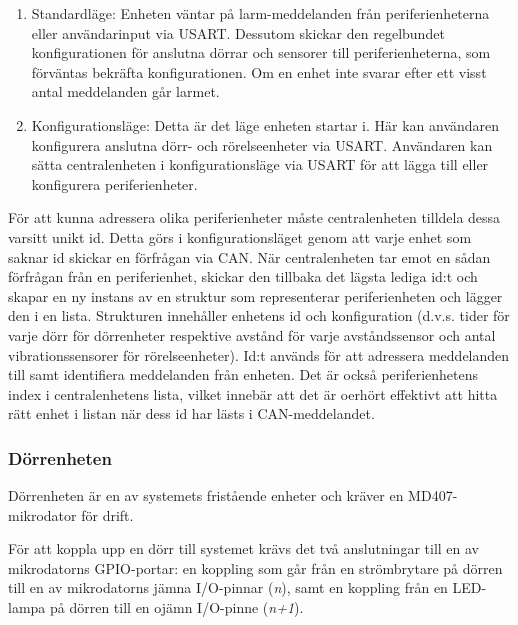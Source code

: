 \documentclass{article}
\begin{document}
\begin{enumerate}
    \item Standardläge: Enheten väntar på larm-meddelanden från periferienheterna eller användarinput via USART. Dessutom skickar den regelbundet  konfigurationen för anslutna dörrar och sensorer till periferienheterna, som förväntas bekräfta konfigurationen. Om en enhet inte svarar efter ett visst antal meddelanden går larmet.
    \item Konfigurationsläge: Detta är det läge enheten startar i. 
     Här kan användaren konfigurera anslutna dörr- och
 rörelseenheter via USART. Användaren kan sätta centralenheten i konfigurationsläge
      via USART för att lägga till eller konfigurera periferienheter.
\end{enumerate}

För att kunna adressera olika periferienheter måste centralenheten tilldela dessa varsitt unikt id. Detta görs i konfigurationsläget genom att varje enhet som saknar id skickar en förfrågan via CAN. När centralenheten tar emot en sådan förfrågan från en periferienhet, skickar den tillbaka det lägsta lediga id:t och skapar en ny instans av en struktur som representerar periferienheten och lägger den i en lista. Strukturen innehåller enhetens id och konfiguration (d.v.s. tider för varje dörr för dörrenheter respektive avstånd för varje avståndssensor och antal vibrationssensorer för rörelseenheter).
Id:t används för att adressera meddelanden till samt identifiera meddelanden från enheten. Det är också periferienhetens index i centralenhetens lista, vilket innebär att det är oerhört effektivt att hitta rätt enhet i listan när dess id har lästs i CAN-meddelandet.





\subsubsection{Dörrenheten}
\label{subsec:Dörrenheten}

Dörrenheten är en av systemets fristående enheter och kräver en MD407-mikrodator för drift.

För att koppla upp en dörr till systemet krävs det två anslutningar till en av mikrodatorns
 GPIO-portar: en koppling som går från en strömbrytare på dörren till en av mikrodatorns jämna
  I/O-pinnar (\textit{n}), samt en koppling från en LED-lampa på dörren till en ojämn I/O-pinne (\textit{n+1}).
\end{document}
